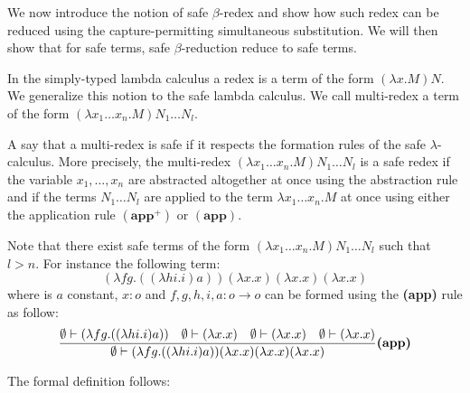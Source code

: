 We now introduce the notion of safe $\beta$-redex and show how such redex can be reduced using the
capture-permitting simultaneous substitution. We will then show that
for safe terms, safe $\beta$-reduction reduce to safe terms.


In the simply-typed lambda calculus a redex is a term of the form $(\lambda x . M) N$.
We generalize this notion to the safe lambda calculus. We call multi-redex a term of the form
$(\lambda x_1 \ldots x_n . M) N_1 \ldots N_l$.


A say that a multi-redex is safe if it respects the formation rules of the safe $\lambda$-calculus. More precisely,
the multi-redex $(\lambda x_1 \ldots x_n . M) N_1 \ldots N_l$ is a safe redex if the variable $x_1,\ldots,x_n$
are abstracted altogether at once using the abstraction rule and if the terms $N_1 \ldots N_l$ are applied to the
term $\lambda x_1 \ldots x_n . M$ at once using either the application rule $\mathbf{(app^+)}$ or $\mathbf{(app)}$.

Note that there exist safe terms of the form $(\lambda x_1 \ldots x_n . M) N_1 \ldots N_l$
such that $l>n$. For instance the following term:
$$ (\lambda f g . ((\lambda h i . i) a) ) (\lambda x.x) (\lambda x.x) (\lambda x.x)$$
where is $a$ constant, $x : o$ and $f,g,h,i,a:o \rightarrow o$ can be formed using the \textbf{(app)} rule as follow:
$$ \frac{\displaystyle 
    \emptyset \vdash (\lambda f g . ((\lambda h i . i) a) )
        \quad \emptyset \vdash (\lambda x.x)
        \quad \emptyset \vdash (\lambda x.x)
        \quad \emptyset \vdash (\lambda x.x)
    }{
       \emptyset \vdash (\lambda f g . ((\lambda h i . i) a) ) (\lambda x.x) (\lambda x.x) (\lambda x.x)
    } \textbf{(app)}
$$


The formal definition follows:

